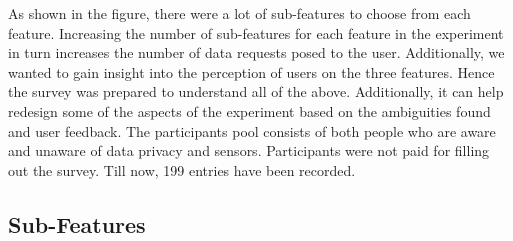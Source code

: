 As shown in the figure, there were a lot of sub-features to choose from each feature.
Increasing the number of sub-features for each feature in the experiment in turn increases the number of data requests posed to the user. Additionally,
we wanted to gain insight into the perception of users on the three features. Hence the survey
was prepared to understand all of the above. Additionally, it can help redesign some of the aspects of the experiment based on the
ambiguities found and user feedback. The participants pool consists of both people who are aware and unaware of data privacy and sensors. Participants were not paid for filling out the survey. Till now, 199 entries have been recorded.

\subsection{Sub-Features}

%
%

